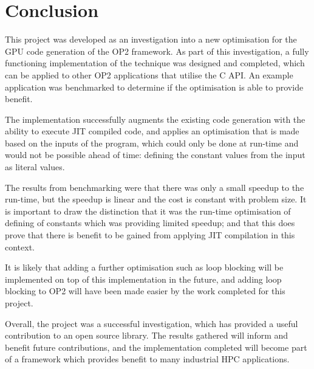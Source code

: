 
\section{Conclusion}
\label{s:conc}

This project was developed as an investigation into a new optimisation for the GPU code generation of the OP2 framework. As part of this investigation, a fully functioning implementation of the technique was designed and completed, which can be applied to other OP2 applications that utilise the C API. An example application was benchmarked to determine if the optimisation is able to provide benefit.
\par
The implementation successfully augments the existing code generation with the ability to execute JIT compiled code, and applies an optimisation that is made based on the inputs of the program, which could only be done at run-time and would not be possible ahead of time: defining the constant values from the input as literal values.
\par
The results from benchmarking were that there was only a small speedup to the run-time, but the speedup is linear and the cost is constant with problem size. It is important to draw the distinction that it was the run-time optimisation of defining of constants which was providing limited speedup; and that this does prove that there is benefit to be gained from applying JIT compilation in this context.
\par
It is likely that adding a further optimisation such as loop blocking will be implemented on top of this implementation in the future, and adding loop blocking to OP2 will have been made easier by the work completed for this project.
\par
Overall, the project was a successful investigation, which has provided a useful contribution to an open source library. The results gathered will inform and benefit future contributions, and the implementation completed will become part of a framework which provides benefit to many industrial HPC applications.
